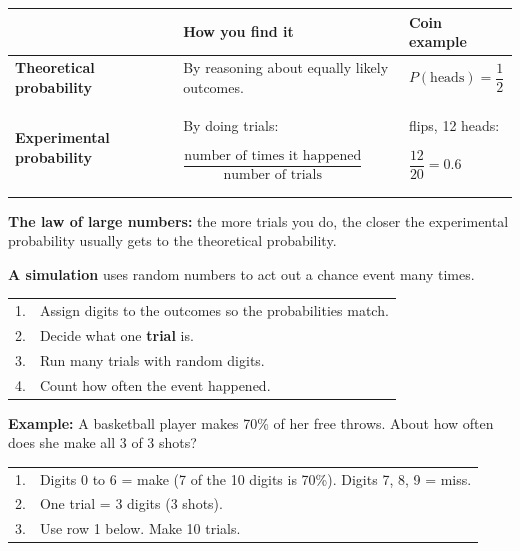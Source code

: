 \documentclass[11pt]{article}
\begin{document}

\renewcommand{\arraystretch}{1.3}
\begin{tabular}{|>{\raggedright\arraybackslash}p{1.6in}|>{\raggedright\arraybackslash}p{2.7in}|>{\raggedright\arraybackslash}p{2.1in}|}\hline
 & \textbf{How you find it} & \textbf{Coin example}\\ \hline
\textbf{Theoretical probability} & By reasoning about equally likely outcomes. & \rule{0pt}{1.8em}$P(\text{heads}) = \dfrac{1}{2}$\\[0.3em] \hline
\textbf{Experimental probability} & By doing trials:\par\rule{0pt}{2.2em}$\dfrac{\text{number of times it happened}}{\text{number of trials}}$\rule[-1.2em]{0pt}{0pt} & 20 flips, 12 heads:\par\rule{0pt}{1.8em}$\dfrac{12}{20} = 0.6$\\[0.9em] \hline
\end{tabular}

\vspace{0.6em}
\textbf{The law of large numbers:} the more trials you do, the closer the experimental probability usually gets to the theoretical probability.

\vspace{1em}
\textbf{A simulation} uses random numbers to act out a chance event many times.

\vspace{0.3em}
\begin{tabular}{@{}ll}
1. & Assign digits to the outcomes so the probabilities match.\\
2. & Decide what one \textbf{trial} is.\\
3. & Run many trials with random digits.\\
4. & Count how often the event happened.\\
\end{tabular}

\vspace{0.8em}
\textbf{Example:} A basketball player makes 70\% of her free throws. About how often does she make all 3 of 3 shots?

\vspace{0.3em}
\begin{tabular}{@{}ll}
1. & Digits 0 to 6 = make (7 of the 10 digits is 70\%). \; Digits 7, 8, 9 = miss.\\
2. & One trial = 3 digits (3 shots).\\
3. & Use row 1 below. Make 10 trials.\\
\end{tabular}
\end{document}
